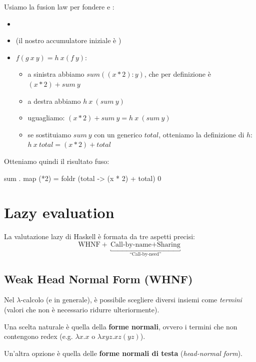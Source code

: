Usiamo la fusion law per fondere  e :
\begin{itemize}
    \item {}
    \item {} (il nostro accumulatore iniziale è )
    \item $f (g \ x \ y) = h \ x (f \ y)$:
        \begin{itemize}
            \item a sinistra abbiamo $sum ((x*2) : y)$, che per definizione è $(x*2) + sum\  y$
            \item a destra abbiamo $h \ x \ (sum \ y)$
            \item uguagliamo: $(x*2) + sum\  y = h \ x \ (sum \ y)$
            \item se sostituiamo $sum \ y$ con un generico $total$, otteniamo la definizione di $h$: $h \ x \ total = (x*2) + total$
        \end{itemize}
\end{itemize}

Otteniamo quindi il risultato fuso:
\begin{haskellbox}{}
sum . map (*2) = foldr (\x total -> (x * 2) + total) 0
\end{haskellbox}


\section{Lazy evaluation}
La valutazione lazy di Haskell è formata da tre aspetti precisi:
$$ \text{WHNF} + \underbracket{\text{Call-by-name} + \text{Sharing}}_{\text{``Call-by-need''}}$$

\subsection{Weak Head Normal Form (WHNF)}
Nel $\lambda$-calcolo (e in generale), è possibile scegliere diversi insiemi come \textit{termini} (valori che non è necessario ridurre ulteriormente).

Una scelta naturale è quella della \textbf{forme normali}, ovvero i termini che non contengono redex (e.g. $\lambda x.x$ o $\lambda xyz.xz(yz)$).

Un'altra opzione è quella delle \textbf{forme normali di testa} (\textit{head-normal form}).

